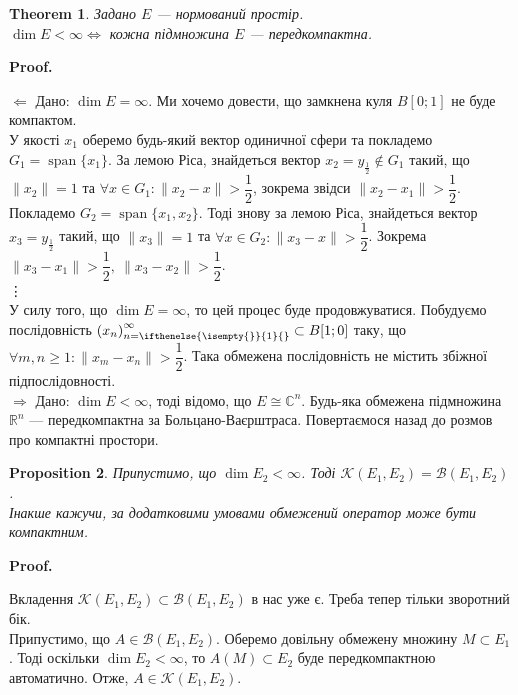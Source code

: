 \documentclass[a4paper, 10pt]{article}
\makeatletter
\def\rightproof{$\boxed{\Rightarrow}$ }
\def\leftproof{$\boxed{\Leftarrow}$ }
\theoremstyle{theoremdd}
\newtheorem{theorem}{Theorem}[subsection]
\theoremstyle{theoremdd}
\theoremstyle{theoremdd}
\theoremstyle{theoremdd}
\theoremstyle{theoremdd}
\newtheorem{proposition}[theorem]{Proposition}
\theoremstyle{theoremdd}
\theoremstyle{theoremdd}
\theoremstyle{theoremdd}
\newcommand{\sequence}[2][]{\left({#2}\right)_{n=\ifthenelse{\isempty{#1}}{1}{#1}}^{\infty}}
\renewenvironment{proof}[1][Proof.\\]{\par
\pushQED{\hfill \qed}%
\normalfont \topsep6\p@\@plus6\p@\relax
\trivlist
\item\relax
{\bfseries
#1\@addpunct{.}}\hspace\labelsep\ignorespaces
}{%
\popQED\endtrivlist\@endpefalse
}
\DeclareMathOperator{\linspan}{span}
\makeatother
\begin{document}
\begin{theorem}
Задано $E$ --- нормований простір.\\
$\dim E < \infty \iff$ кожна підмножина $E$ --- передкомпактна.
\end{theorem}

\begin{proof}
\leftproof Дано: $\dim E = \infty$. Ми хочемо довести, що замкнена куля $B[0;1]$ не буде компактом.\\
У якості $x_1$ оберемо будь-який вектор одиничної сфери та покладемо $G_1 = \linspan\{x_1\}$. За лемою Ріса, знайдеться вектор $x_2 = y_{\frac{1}{2}} \notin G_1$ такий, що $\|x_2\| = 1$ та $\forall x \in G_1: \|x_2-x\| > \dfrac{1}{2}$, зокрема звідси $\|x_2 - x_1\| > \dfrac{1}{2}$.\\
Покладемо $G_2 = \linspan\{x_1,x_2\}$. Тоді знову за лемою Ріса, знайдеться вектор $x_3 = y_{\frac{1}{2}}$ такий, що $\|x_3\| = 1$ та $\forall x \in G_2: \|x_3-x\| > \dfrac{1}{2}$. Зокрема $\|x_3 - x_1\| > \dfrac{1}{2},\ \|x_3 - x_2\| > \dfrac{1}{2}$.\\
\vdots \\
У силу того, що $\dim E = \infty$, то цей процес буде продовжуватися. Побудуємо послідовність $\sequence{x_n} \subset B[1;0]$ таку, що $\forall m,n \geq 1: \| x_m - x_n \| > \dfrac{1}{2}$. Така обмежена послідовність не містить збіжної підпослідовності.
\bigskip \\
\rightproof Дано: $\dim E < \infty$, тоді відомо, що $E \cong \mathbb{C}^n$. Будь-яка обмежена підмножина $\mathbb{R}^n$ --- передкомпактна за Больцано-Ваєрштраса.
\end{proof}
\noindent
Повертаємося назад до розмов про компактні простори.

\begin{proposition}
Припустимо, що $\dim E_2 < \infty$. Тоді $\mathcal{K}(E_1,E_2) = \mathcal{B}(E_1,E_2)$.\\
Інакше кажучи, за додатковими умовами обмежений оператор може бути компактним.
\end{proposition}

\begin{proof}
Вкладення $\mathcal{K}(E_1,E_2) \subset \mathcal{B}(E_1,E_2)$ в нас уже є. Треба тепер тільки зворотний бік.\\
Припустимо, що $A \in \mathcal{B}(E_1,E_2)$. Оберемо довільну обмежену множину $M \subset E_1$. Тоді оскільки $\dim E_2 < \infty$, то $A(M) \subset E_2$ буде передкомпактною автоматично. Отже, $A \in \mathcal{K}(E_1,E_2)$.
\end{proof}
\end{document}
